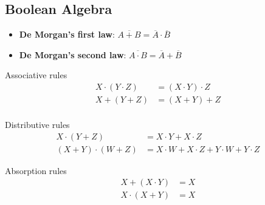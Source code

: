 \subsection{Boolean Algebra}

\begin{itemize}
    \item \textbf{De Morgan's first law}: $\overline{A+B}=\overline{A}\cdot\overline{B}$
    \item \textbf{De Morgan's second law}: $\overline{A\cdot B}=\overline{A}+\overline{B}$
\end{itemize}

Associative rules
\begin{align*}
    X\cdot(Y\cdot Z)&=(X\cdot Y)\cdot Z\\
    X+(Y+Z)&=(X+Y)+Z\\
\end{align*}

Distributive rules
\begin{align*}
    X\cdot(Y+Z)&=X\cdot Y+X\cdot Z\\
    (X+Y)\cdot(W+Z)&=X\cdot W+X\cdot Z+Y\cdot W+Y\cdot Z
\end{align*}

Absorption rules
\begin{align*}
    X+(X\cdot Y)&=X\\
    X\cdot(X+Y)&=X
\end{align*}
